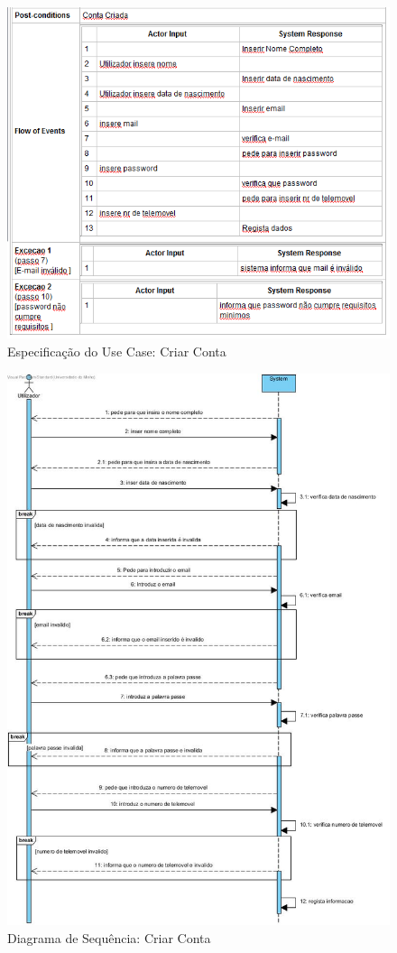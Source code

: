 \begin{figure}[htb!]
	\centering
	\includegraphics[scale=0.6]{imagens/Especificacoes/criarconta}  
	\caption{Especificação do Use Case: Criar Conta   }  
\end{figure}

\begin{figure}[htb!]
	\centering
	\includegraphics[scale=0.55]{imagens/diagramaSeq/CriarConta}  
	\caption{Diagrama de Sequência: Criar Conta}  
\end{figure}

